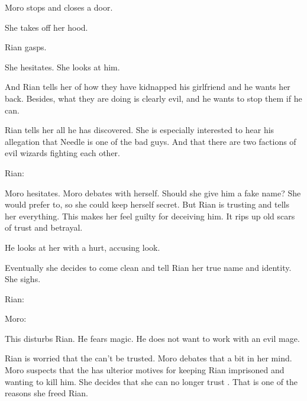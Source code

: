 Moro stops and closes a door. 

She takes off her hood. 

Rian gasps.



She hesitates. 
She looks at him.



And Rian tells her of how they have kidnapped his girlfriend and he wants her back.
Besides, what they are doing is clearly evil, and he wants to stop them if he can. 


Rian tells her all he has discovered. 
She is especially interested to hear his allegation that Needle is one of the bad guys. 
And that there are two factions of evil wizards fighting each other. 

Rian:

Moro hesitates. 
Moro debates with herself. 
Should she give him a fake name? 
She would prefer to, so she could keep herself secret. 
But Rian is trusting and tells her everything. 
This makes her feel guilty for deceiving him. 
It rips up old scars of trust and betrayal. 

He looks at her with a hurt, accusing look.

Eventually she decides to come clean and tell Rian her true name and identity. 
She sighs.

Rian:

Moro:

This disturbs Rian. 
He fears magic. 
He does not want to work with an evil mage.

Rian is worried that the \rinyuth can't be trusted. 
Moro debates that a bit in her mind.
Moro suspects that the \rinyuth has ulterior motives for keeping Rian imprisoned and wanting to kill him. 
She decides that she can no longer trust \Tiroco.
That is one of the reasons she freed Rian. 

